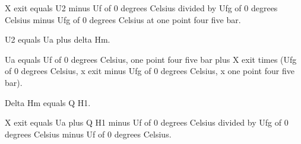 X exit equals U2 minus Uf of 0 degrees Celsius divided by Ufg of 0 degrees Celsius minus Ufg of 0 degrees Celsius at one point four five bar.

U2 equals Ua plus delta Hm.

Ua equals Uf of 0 degrees Celsius, one point four five bar plus X exit times (Ufg of 0 degrees Celsius, x exit minus Ufg of 0 degrees Celsius, x one point four five bar).

Delta Hm equals Q H1.

X exit equals Ua plus Q H1 minus Uf of 0 degrees Celsius divided by Ufg of 0 degrees Celsius minus Uf of 0 degrees Celsius.